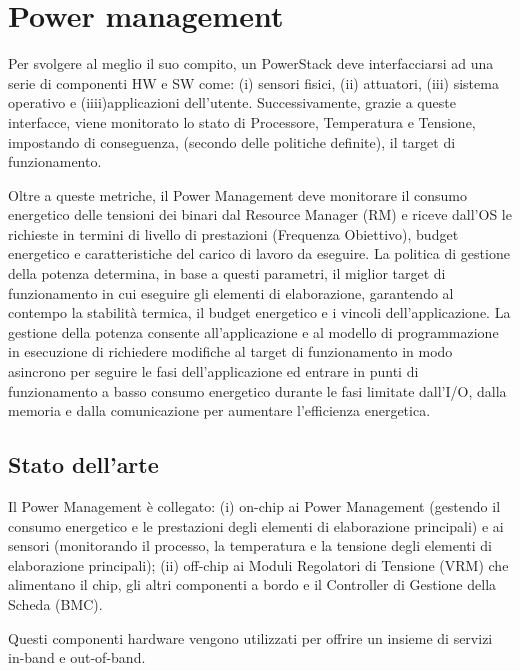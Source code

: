 \chapter{Power management}


Per svolgere al meglio il suo compito, un PowerStack deve interfacciarsi ad una serie di componenti HW e SW come: (i) sensori fisici, (ii) attuatori, (iii) sistema operativo e (iiii)applicazioni dell'utente. Successivamente, grazie a queste interfacce, viene monitorato lo stato di Processore, Temperatura e Tensione, impostando di conseguenza, (secondo delle politiche definite), il target di funzionamento. 

Oltre a queste metriche, il Power Management deve monitorare il consumo energetico delle tensioni dei binari dal Resource Manager (RM) e riceve dall'OS le richieste in termini di livello di prestazioni (Frequenza Obiettivo), budget energetico e caratteristiche del carico di lavoro da eseguire. La politica di gestione della potenza determina, in base a questi parametri, il miglior target di funzionamento in cui eseguire gli elementi di elaborazione, garantendo al contempo la stabilità termica, il budget energetico e i vincoli dell'applicazione. La gestione della potenza consente all'applicazione e al modello di programmazione in esecuzione di richiedere modifiche al target di funzionamento in modo asincrono per seguire le fasi dell'applicazione ed entrare in punti di funzionamento a basso consumo energetico durante le fasi limitate dall'I/O, dalla memoria e dalla comunicazione per aumentare l'efficienza energetica.


\section{Stato dell'arte}

Il Power Management è collegato: (i) on-chip ai Power Management (gestendo il consumo energetico e le prestazioni degli elementi di elaborazione principali) e ai sensori (monitorando il processo, la temperatura e la tensione degli elementi di elaborazione principali); (ii) off-chip ai Moduli Regolatori di Tensione (VRM) che alimentano il chip, gli altri componenti a bordo e il Controller di Gestione della Scheda (BMC).

Questi componenti hardware vengono utilizzati per offrire un insieme di servizi in-band e out-of-band.

